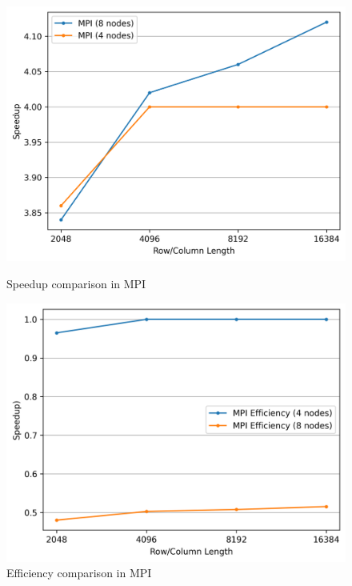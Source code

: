 \begin{figure}[h!]
    \begin{minipage}[t]{0.49\textwidth}
        \centering
        \includegraphics[width=\textwidth]{img/MPI/mpi_speedup.png}
        \caption{Speedup comparison in MPI}
        \label{MPI_Speedup}
    \end{minipage}
    \hfill
    \begin{minipage}[t]{0.49\textwidth}
        \centering
        \includegraphics[width=\textwidth]{img/MPI/mpi_efficiency.png}
        \caption{Efficiency comparison in MPI}
        \label{MPI_Efficiency}


\end{minipage}
\end{figure}

